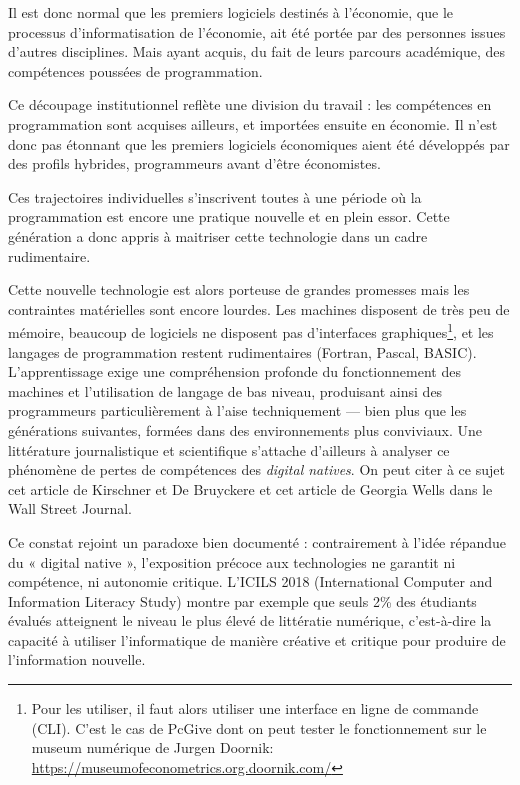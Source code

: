Il est donc normal que les premiers logiciels destinés à l’économie, que le processus d’informatisation de l’économie, ait été portée par des personnes issues d'autres disciplines. Mais ayant acquis, du fait de leurs parcours académique, des compétences poussées de programmation.

Ce découpage institutionnel reflète une division du travail : les compétences en programmation sont acquises ailleurs, et importées ensuite en économie. Il n’est donc pas étonnant que les premiers logiciels économiques aient été développés par des profils hybrides, programmeurs avant d’être économistes.



Ces trajectoires individuelles s’inscrivent toutes à une période où la programmation est encore une pratique nouvelle et en plein essor. Cette génération a donc appris à maitriser cette technologie dans un cadre rudimentaire.

Cette nouvelle technologie est alors porteuse de grandes promesses mais les contraintes matérielles sont encore lourdes. Les machines disposent de très peu de mémoire, beaucoup de logiciels ne disposent pas d'interfaces graphiques\footnote{Pour les utiliser, il faut alors utiliser une interface en ligne de commande (CLI). C'est le cas de PcGive dont on peut tester le fonctionnement sur le museum numérique de Jurgen Doornik: \url{https://museumofeconometrics.org.doornik.com/}}, et les langages de programmation restent rudimentaires (Fortran, Pascal, BASIC). L’apprentissage exige une compréhension profonde du fonctionnement des machines et l'utilisation de langage de bas niveau, produisant ainsi des programmeurs particulièrement à l’aise techniquement — bien plus que les générations suivantes, formées dans des environnements plus conviviaux. Une littérature journalistique et scientifique s'attache d'ailleurs à analyser ce phénomène de pertes de compétences des \textit{digital natives}. On peut citer à ce sujet cet article de Kirschner et De Bruyckere \cite{kirschnerMythsDigitalNative2017} et cet article de Georgia Wells dans le Wall Street Journal\cite{wellsGenZersAre2024}.

Ce constat rejoint un paradoxe bien documenté : contrairement à l’idée répandue du « digital native », l’exposition précoce aux technologies ne garantit ni compétence, ni autonomie critique. L’ICILS 2018 (International Computer and Information Literacy Study) montre par exemple que seuls 2\% des étudiants évalués atteignent le niveau le plus élevé de littératie numérique, c’est-à-dire la capacité à utiliser l’informatique de manière créative et critique pour produire de l’information nouvelle.

